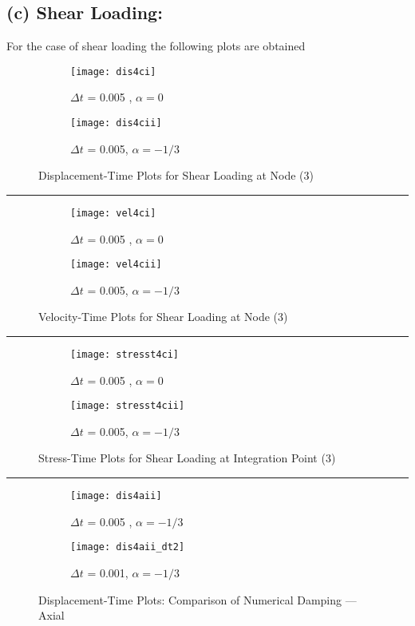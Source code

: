 \subsection*{(c) Shear Loading: }
For the case of shear loading the following plots are obtained 
\begin{figure}[htbp]
\centering
\begin{subfigure}{.5\textwidth}
  \centering
  \texttt{[image: dis4ci]}
  \caption{$\Delta t$ = 0.005 , $\alpha = 0$}
  \label{fig:sub1}
\end{subfigure}%
\begin{subfigure}{.5\textwidth}
  \centering
  \texttt{[image: dis4cii]}
  \caption{$\Delta t$ = 0.005, $\alpha = -1/3$}
  \label{fig:sub2}
\end{subfigure}
\caption{ Displacement-Time Plots for Shear Loading at Node (3) }
\label{Disp-Shear}
\end{figure}\hrule
\begin{figure}[htbp]
\centering
\begin{subfigure}{.5\textwidth}
  \centering
  \texttt{[image: vel4ci]}
  \caption{$\Delta t$ = 0.005 , $\alpha = 0$}
  \label{fig:sub1}
\end{subfigure}%
\begin{subfigure}{.5\textwidth}
  \centering
  \texttt{[image: vel4cii]}
  \caption{$\Delta t$ = 0.005, $\alpha = -1/3$}
  \label{fig:sub2}
\end{subfigure}
\caption{ Velocity-Time Plots for Shear Loading at Node (3) }
\label{Vel-Shear}
\end{figure}\hrule
\begin{figure}[htbp]
\centering
\begin{subfigure}{.5\textwidth}
  \centering
  \texttt{[image: stresst4ci]}
  \caption{$\Delta t$ = 0.005 , $\alpha = 0$}
  \label{fig:sub1}
\end{subfigure}%
\begin{subfigure}{.5\textwidth}
  \centering
  \texttt{[image: stresst4cii]}
  \caption{$\Delta t$ = 0.005, $\alpha = -1/3$}
  \label{fig:sub2}
\end{subfigure}
\caption{ Stress-Time Plots for Shear Loading at Integration Point (3) }
\label{Stress-Shear}
\end{figure}\hrule
\begin{figure}[htbp]
\centering
\begin{subfigure}{.5\textwidth}
  \centering
  \texttt{[image: dis4aii]}
  \caption{$\Delta t$ = 0.005 , $\alpha = -1/3$}
  \label{fig:sub1}
\end{subfigure}%
\begin{subfigure}{.5\textwidth}
  \centering
  \texttt{[image: dis4aii\_dt2]}
  \caption{$\Delta t$ = 0.001, $\alpha = -1/3$}
  \label{fig:sub2}
\end{subfigure}
\caption{ Displacement-Time Plots: Comparison of Numerical Damping --- Axial }
\end{figure}
